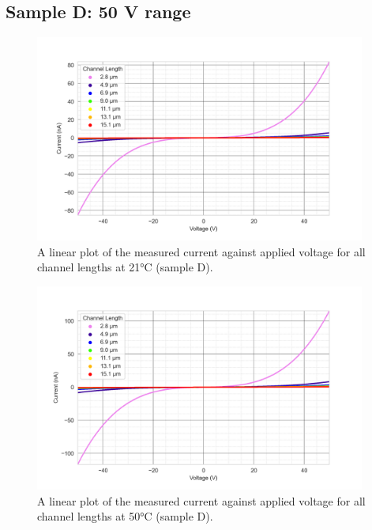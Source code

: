\subsection{Sample D: 50 \si{\volt} range}
\begin{figure}[h]
    \centering
    \includegraphics[width=0.97\textwidth]{Chapter3/Figs/Raster/Sample D 2019/IV/50v IV characteristics at 21 C.png}
    \caption{A linear plot of the measured current against applied voltage for all channel lengths at 21\si{\degreeCelsius} (sample D).}
    \label{appfig:D_current_voltage_21_50v}
\end{figure}
\begin{figure}[h]
    \centering
    \includegraphics[width=0.97\textwidth]{Chapter3/Figs/Raster/Sample D 2019/IV/50v IV characteristics at 50 C.png}
    \caption{A linear plot of the measured current against applied voltage for all channel lengths at 50\si{\degreeCelsius} (sample D).}
    \label{appfig:D_current_voltage_50_50v}
\end{figure}
